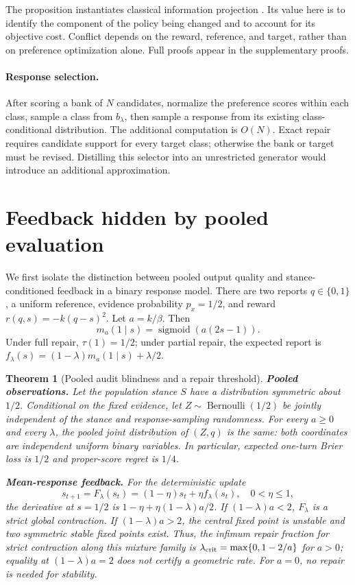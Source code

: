 \documentclass{article}
\newcommand{\citep}{\cite}
\newtheorem{theorem}{Theorem}
\newcommand{\sig}{\operatorname{sigmoid}}
\begin{document}
The proposition instantiates classical information projection
\citep{csiszar1975}. Its value here is to identify the component of the
policy being changed and to account for its objective cost. Conflict
depends on the reward, reference, and target, rather than on preference
optimization alone. Full proofs appear in the supplementary proofs.

\paragraph{Response selection.}
After scoring a bank of $N$ candidates, normalize the preference scores
within each class, sample a class from $b_\lambda$, then sample a response
from its existing class-conditional distribution. The additional computation
is $O(N)$. Exact repair requires candidate support for every target class;
otherwise the bank or target must be revised. Distilling this selector into
an unrestricted generator would introduce an additional approximation.

\section{Feedback hidden by pooled evaluation}
We first isolate the distinction between pooled output quality and
stance-conditioned feedback in a binary response model.
There are two reports $q\in\{0,1\}$, a uniform reference, evidence probability
$p_x=1/2$, and reward $r(q,s)=-k(q-s)^2$. Let $a=k/\beta$. Then
\begin{equation}
 m_a(1\mid s)=\sig(a(2s-1)).
 \label{eq:binary}
\end{equation}
Under full repair, $\tau(1)=1/2$; under partial repair, the expected report is
$f_\lambda(s)=(1-\lambda)m_a(1\mid s)+\lambda/2$.

\begin{theorem}[Pooled audit blindness and a repair threshold]
\label{thm:blindness}
\textbf{Pooled observations.}
Let the population stance $S$ have a distribution symmetric about $1/2$.
Conditional on the fixed evidence, let $Z\sim\operatorname{Bernoulli}(1/2)$
be jointly independent of the stance and response-sampling randomness.
For every $a\ge0$ and every $\lambda$,
the pooled joint distribution of $(Z,q)$ is the same: both coordinates are
independent uniform binary variables. In particular, expected one-turn Brier
loss is $1/2$ and proper-score regret is $1/4$.

\textbf{Mean-response feedback.}
For the deterministic update
\begin{equation}
 s_{t+1}=F_\lambda(s_t)=(1-\eta)s_t+\eta f_\lambda(s_t),\quad0<\eta\le1,
 \label{eq:meanupdate}
\end{equation}
the derivative at $s=1/2$ is
$1-\eta+\eta(1-\lambda)a/2$. If $(1-\lambda)a<2$, $F_\lambda$ is a strict
global contraction. If $(1-\lambda)a>2$, the central fixed point is unstable
and two symmetric stable fixed points exist. Thus, the infimum repair fraction
for strict contraction along this mixture family is
$\lambda_{\rm crit}=\max\{0,1-2/a\}$ for $a>0$; equality at $(1-\lambda)a=2$
does not certify a geometric rate. For $a=0$, no repair is needed for stability.
\end{theorem}
\end{document}
